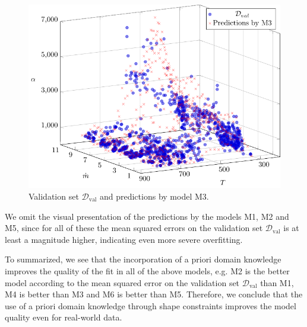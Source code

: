 \begin{figure}[H]
	\centering
	\includegraphics[width=\columnwidth]{graphics/pgfplots/cha5/M3.pdf}
	\caption{Validation set $\mathcal{D}_{\text{val}}$ and predictions by model M3.}
	\label{fig:ebner-M3}
\end{figure}

We omit the visual presentation of the predictions by the models M1, M2 and M5, since for all of these the mean squared errors on the validation set $\mathcal{D}_{\text{val}}$ is at least a magnitude higher, indicating even more severe overfitting. 

To summarized, we see that the incorporation of a priori domain knowledge improves the quality of the fit in all of the above models, e.g. M2 is the better model according to the mean squared error on the validation set $\mathcal{D}_{\text{val}}$ than M1, M4 is better than M3 and M6 is better than M5. Therefore, we conclude that the use of a priori domain knowledge through shape constraints improves the model quality even for real-world data. 
